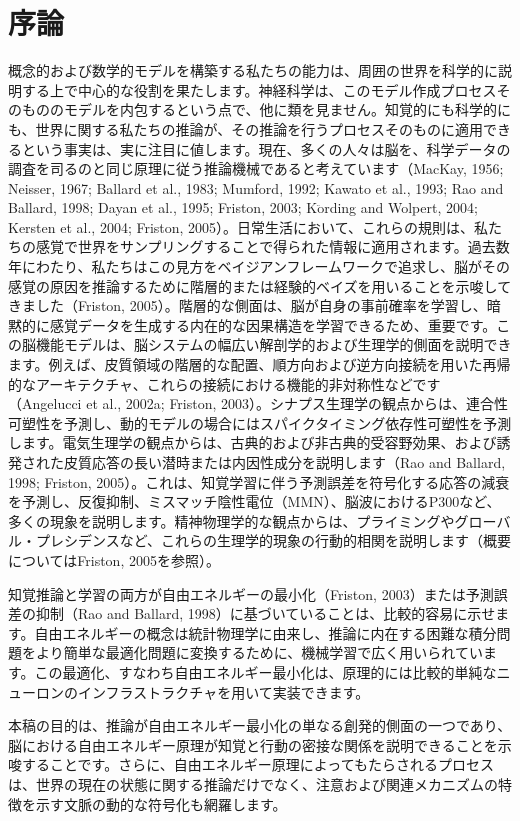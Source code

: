 \documentclass{article}
\begin{document}
\section{序論}
概念的および数学的モデルを構築する私たちの能力は、周囲の世界を科学的に説明する上で中心的な役割を果たします。神経科学は、このモデル作成プロセスそのもののモデルを内包するという点で、他に類を見ません。知覚的にも科学的にも、世界に関する私たちの推論が、その推論を行うプロセスそのものに適用できるという事実は、実に注目に値します。現在、多くの人々は脳を、科学データの調査を司るのと同じ原理に従う推論機械であると考えています（MacKay, 1956; Neisser, 1967; Ballard et al., 1983; Mumford, 1992; Kawato et al., 1993; Rao and Ballard, 1998; Dayan et al., 1995; Friston, 2003; K$\ddot{\mathrm{o}}$rding and Wolpert, 2004; Kersten et al., 2004; Friston, 2005）。日常生活において、これらの規則は、私たちの感覚で世界をサンプリングすることで得られた情報に適用されます。過去数年にわたり、私たちはこの見方をベイジアンフレームワークで追求し、脳がその感覚の原因を推論するために階層的または経験的ベイズを用いることを示唆してきました（Friston, 2005）。階層的な側面は、脳が自身の事前確率を学習し、暗黙的に感覚データを生成する内在的な因果構造を学習できるため、重要です。この脳機能モデルは、脳システムの幅広い解剖学的および生理学的側面を説明できます。例えば、皮質領域の階層的な配置、順方向および逆方向接続を用いた再帰的なアーキテクチャ、これらの接続における機能的非対称性などです（Angelucci et al., 2002a; Friston, 2003）。シナプス生理学の観点からは、連合性可塑性を予測し、動的モデルの場合にはスパイクタイミング依存性可塑性を予測します。電気生理学の観点からは、古典的および非古典的受容野効果、および誘発された皮質応答の長い潜時または内因性成分を説明します（Rao and Ballard, 1998; Friston, 2005）。これは、知覚学習に伴う予測誤差を符号化する応答の減衰を予測し、反復抑制、ミスマッチ陰性電位（MMN）、脳波におけるP300など、多くの現象を説明します。精神物理学的な観点からは、プライミングやグローバル・プレシデンスなど、これらの生理学的現象の行動的相関を説明します（概要についてはFriston, 2005を参照）。

知覚推論と学習の両方が自由エネルギーの最小化（Friston, 2003）または予測誤差の抑制（Rao and Ballard, 1998）に基づいていることは、比較的容易に示せます。自由エネルギーの概念は統計物理学に由来し、推論に内在する困難な積分問題をより簡単な最適化問題に変換するために、機械学習で広く用いられています。この最適化、すなわち自由エネルギー最小化は、原理的には比較的単純なニューロンのインフラストラクチャを用いて実装できます。

本稿の目的は、推論が自由エネルギー最小化の単なる創発的側面の一つであり、脳における自由エネルギー原理が知覚と行動の密接な関係を説明できることを示唆することです。さらに、自由エネルギー原理によってもたらされるプロセスは、世界の現在の状態に関する推論だけでなく、注意および関連メカニズムの特徴を示す文脈の動的な符号化も網羅します。
\end{document}
